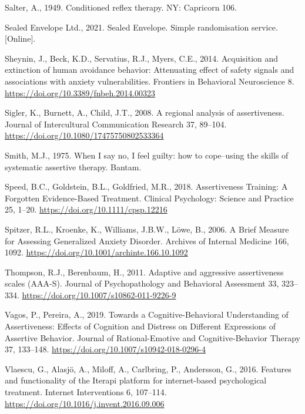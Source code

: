 \documentclass[3p]{elsarticle} %
\newlength{\cslhangindent}
\newlength{\cslentryspacingunit} %
\newenvironment{CSLReferences}[2] %
 {%
  \setlength{\parindent}{0pt}
  \ifodd #1
  \let\oldpar\par
  \def\par{\hangindent=\cslhangindent\oldpar}
  \fi
  \setlength{\parskip}{#2\cslentryspacingunit}
 }%
 {}
\begin{document}
\begin{CSLReferences}{1}{0}
\leavevmode{}%
Salter, A., 1949. {Conditioned reflex therapy}. NY: Capricorn 106.

\leavevmode{}%
Sealed Envelope Ltd., 2021. {Sealed Envelope. Simple randomisation
service. {[}Online{]}}.

\leavevmode{}%
Sheynin, J., Beck, K.D., Servatius, R.J., Myers, C.E., 2014. Acquisition
and extinction of human avoidance behavior: Attenuating effect of safety
signals and associations with anxiety vulnerabilities. Frontiers in
Behavioral Neuroscience 8.
\url{https://doi.org/10.3389/fnbeh.2014.00323}

\leavevmode{}%
Sigler, K., Burnett, A., Child, J.T., 2008. A regional analysis of
assertiveness. Journal of Intercultural Communication Research 37,
89--104. \url{https://doi.org/10.1080/17475750802533364}

\leavevmode{}%
Smith, M.J., 1975. {When I say no, I feel guilty: how to cope--using the
skills of systematic assertive therapy}. Bantam.

\leavevmode{}%
Speed, B.C., Goldstein, B.L., Goldfried, M.R., 2018. {Assertiveness
Training: A Forgotten Evidence-Based Treatment}. Clinical Psychology:
Science and Practice 25, 1--20. \url{https://doi.org/10.1111/cpsp.12216}

\leavevmode{}%
Spitzer, R.L., Kroenke, K., Williams, J.B.W., Löwe, B., 2006. {A Brief
Measure for Assessing Generalized Anxiety Disorder}. Archives of
Internal Medicine 166, 1092.
\url{https://doi.org/10.1001/archinte.166.10.1092}

\leavevmode{}%
Thompson, R.J., Berenbaum, H., 2011. {Adaptive and aggressive
assertiveness scales (AAA-S)}. Journal of Psychopathology and Behavioral
Assessment 33, 323--334. \url{https://doi.org/10.1007/s10862-011-9226-9}

\leavevmode{}%
Vagos, P., Pereira, A., 2019. {Towards a Cognitive-Behavioral
Understanding of Assertiveness: Effects of Cognition and Distress on
Different Expressions of Assertive Behavior}. Journal of
Rational-Emotive and Cognitive-Behavior Therapy 37, 133--148.
\url{https://doi.org/10.1007/s10942-018-0296-4}

\leavevmode{}%
Vlaescu, G., Alasjö, A., Miloff, A., Carlbring, P., Andersson, G., 2016.
{Features and functionality of the Iterapi platform for internet-based
psychological treatment}. Internet Interventions 6, 107--114.
\url{https://doi.org/10.1016/j.invent.2016.09.006}


\end{CSLReferences}
\end{document}
